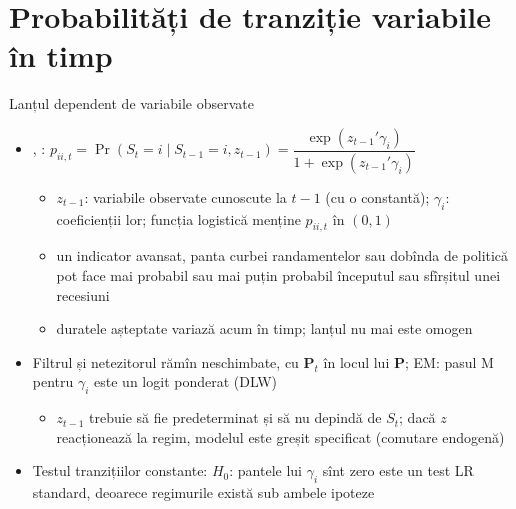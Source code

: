 \section{Probabilități de tranziție variabile în timp}

\begin{frame}{Lanțul dependent de variabile observate}
\itemsize{\small}
\begin{itemize}
    \item {}, : $p_{ii,t} = \Pr(S_t = i \mid S_{t-1} = i, z_{t-1}) = \dfrac{\exp(z_{t-1}'\gamma_i)}{1 + \exp(z_{t-1}'\gamma_i)}$
    \begin{itemize}
        \item $z_{t-1}$: variabile observate cunoscute la $t - 1$ (cu o constantă); $\gamma_i$: coeficienții lor; funcția logistică menține $p_{ii,t}$ în $(0, 1)$
        \item un indicator avansat, panta curbei randamentelor sau dobînda de politică pot face mai probabil sau mai puțin probabil începutul sau sfîrșitul unei recesiuni
        \item duratele așteptate variază acum în timp; lanțul nu mai este omogen
    \end{itemize}
    \item Filtrul și netezitorul rămîn neschimbate, cu $\mathbf{P}_t$ în locul lui $\mathbf{P}$; EM: pasul M pentru $\gamma_i$ este un logit ponderat (DLW)
    \begin{itemize}
        \item $z_{t-1}$ trebuie să fie predeterminat și să nu depindă de $S_t$; dacă $z$ reacționează la regim, modelul este greșit specificat (comutare endogenă)
    \end{itemize}
    \item Testul tranzițiilor constante: $H_0$: pantele lui $\gamma_i$ sînt zero este un test LR standard, deoarece regimurile există sub ambele ipoteze
\end{itemize}
\end{frame}

